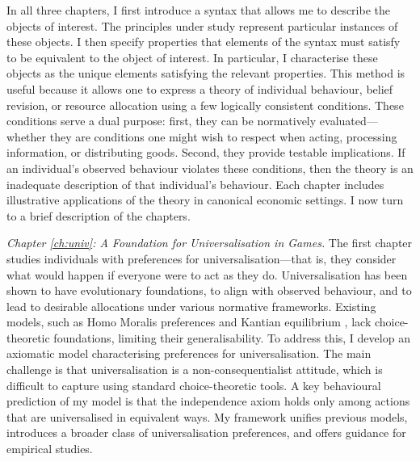 In all three chapters, I first introduce a syntax that allows me to describe the objects of interest. The principles under study represent particular instances of these objects. I then specify properties that elements of the syntax must satisfy to be equivalent to the object of interest. In particular, I characterise these objects as the unique elements satisfying the relevant properties. This method is useful because it allows one to express a theory of individual behaviour, belief revision, or resource allocation using a few logically consistent conditions. These conditions serve a dual purpose: first, they can be normatively evaluated—whether they are conditions one might wish to respect when acting, processing information, or distributing goods. Second, they provide testable implications. If an individual’s observed behaviour violates these conditions, then the theory is an inadequate description of that individual’s behaviour. Each chapter includes illustrative applications of the theory in canonical economic settings. I now turn to a brief description of the chapters.

\emph{Chapter \ref{ch:univ}: A Foundation for Universalisation in Games.} The first chapter studies individuals with preferences for universalisation—that is, they consider what would happen if everyone were to act as they do. Universalisation has been shown to have evolutionary foundations, to align with observed behaviour, and to lead to desirable allocations under various normative frameworks. Existing models, such as Homo Moralis preferences \citep{algerHomoMoralisPreference2013} and Kantian equilibrium \citep{roemer2019we}, lack choice-theoretic foundations, limiting their generalisability. To address this, I develop an axiomatic model characterising preferences for universalisation. The main challenge is that universalisation is a non-consequentialist attitude, which is difficult to capture using standard choice-theoretic tools. A key behavioural prediction of my model is that the independence axiom holds only among actions that are universalised in equivalent ways. My framework unifies previous models, introduces a broader class of universalisation preferences, and offers guidance for empirical studies.

